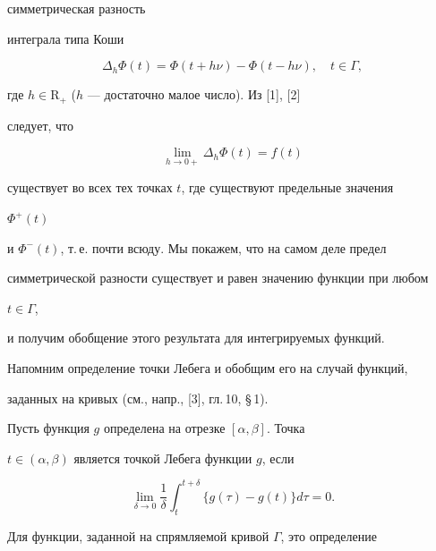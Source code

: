 симметрическая разность 


интеграла типа Коши 


\begin{equation} 


\Delta_h\Phi(t)=\Phi(t+h\nu)-\Phi(t-h\nu),\quad t\in\Gamma, 


\end{equation} 


где $h\in\mathrm R_+$ ($h$ --- достаточно малое число). Из [1], [2] 


следует, что 


\begin{equation} 


\lim_{h\to0+}\Delta_h\Phi(t)=f(t) 


\end{equation} 


существует во всех тех точках $t$, где существуют предельные значения 


$\Phi^+(t)$ 


и $\Phi^-(t)$, т.\,е. почти всюду. Мы покажем, что на самом деле предел 


симметрической разности существует и равен значению функции при любом 


$t\in\Gamma$, 


и получим обобщение этого результата для интегрируемых функций. 


 


Напомним определение точки Лебега и обобщим его на случай функций, 


заданных на кривых (см., напр., [3], гл.\,10, \S\,1). 


 


\begin{defn} 


Пусть функция $g$ определена на отрезке $[\alpha,\beta]$. Точка 


$t\in(\alpha,\beta)$ является точкой Лебега функции $g$, если 


$$ 


\lim_{\delta\to0}\frac{1}{\delta}\int^{t+\delta}_t 


\{g(\tau)-g(t)\}d\tau=0.


$$ 


\end{defn} 


 


Для функции, заданной на спрямляемой кривой $\Gamma$, это определение 


